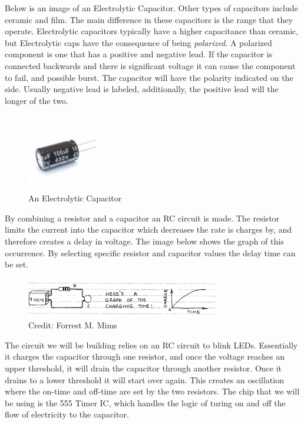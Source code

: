 \documentclass{article}
\begin{document}
      Below is an image of an Electrolytic Capacitor. Other types of capacitors include ceramic and film. The main difference
      in these capacitors is the range that they operate. Electrolytic capacitors typically have a higher capacitance than ceramic, but Electrolytic caps have the
      consequence of being \textit{polarized}. A polarized component is one that has a positive and negative lead. If the capacitor is connected backwards and there
      is significant voltage it can cause the component to fail, and possible burst. The capacitor will have the polarity indicated on the side. Usually negative lead is labeled,
      additionally, the positive lead will the longer of the two.
      
\begin{figure}[H]
\caption{ An Electrolytic Capacitor }
\label{fig:img/capirl.jpg}
\centering
\includegraphics[width=0.3\textwidth]{img/capirl.jpg}
\end{figure}

      By combining a resistor and a capacitor an RC circuit is made. The resistor limits the current into the capacitor which decreases
      the rate is charges by, and therefore creates a delay in voltage. The image below shows the graph of this occurrence. By selecting specific resistor and capacitor
      values the delay time can be set.
      
\begin{figure}[H]
\caption{ Credit: Forrest M. Mims }
\label{fig:img/capcharge.png}
\centering
\includegraphics[width=0.75\textwidth]{img/capcharge.png}
\end{figure}

      The circuit we will be building relies on an RC circuit to blink LEDs. Essentially it charges the capacitor through one resistor, and once the voltage
      reaches an upper threshold, it will drain the capacitor through another resistor. Once it drains to a lower threshold it will start over again. This creates
       an oscillation where the on-time and off-time are set by the two resistors. The chip that we will be using is the 555 Timer IC, which handles the logic
       of turing on and off the flow of electricity to the capacitor.
    
\end{document}
